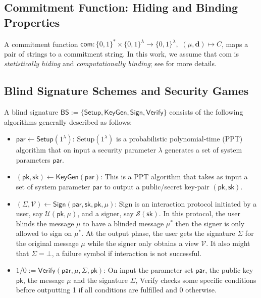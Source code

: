 \documentclass[conference]{IEEEtran}
\begin{document}
	\subsection{Commitment Function: Hiding and Binding Properties}
	A commitment function
	$\mathsf{com}: \{0,1\}^* \times \{0,1\}^{\lambda} \rightarrow \{0,1\}^{\lambda},$  $(\mu,\mathbf{d}) \mapsto C$, maps a pair of strings to a commitment string. In this work, we assume that \textsf{com} is \textit{statistically hiding} and \textit{computationally binding}; see \cite{Ruc10} for more details. %
	
	
	\subsection{Blind Signature Schemes and Security Games} \label{brs}
	A blind signature $\textsf{BS}:=\{\textsf{Setup}, \textsf{KeyGen}, \textsf{Sign}, \textsf{Verify}\}$ consists of the following algorithms generally described as follows:
	\begin{itemize}
		\item $ \mathsf{par} \leftarrow \textsf{Setup}(1^{\lambda})$: \textsf{Setup}$(1^{\lambda})$ is a probabilistic polynomial-time (PPT) algorithm that on input a security parameter $\lambda$ generates a set of system parameters $\mathsf{par}$.
		\item $(\textsf{pk},\textsf{sk}) \leftarrow \textsf{KeyGen}(\mathsf{par})$: This is a PPT algorithm that takes as input a set of system parameter $\mathsf{par}$ to output a public/secret key-pair $(\mathsf{pk},\mathsf{sk})$.
		
		\item $(\Sigma, \mathcal{V}) \leftarrow \textsf{Sign}(\mathsf{par},\mathsf{sk}, \textsf{pk},\mu)$:  \textsf{Sign} is an interaction protocol initiated by a user, say $\mathcal{U}(\textsf{pk},\mu)$, and a signer, say $\mathcal{S}(\mathsf{sk})$. In this protocol, the user blinds the message $\mu$ to have a blinded message $\mu^*$ then the signer is only allowed to sign on $\mu^*$. At the output phase, the user gets the signature $\Sigma$ for the original message $\mu$ while the signer only obtains a view $\mathcal{V}.$ It also might that $\Sigma=\bot$, a failure symbol if interaction is not successful.  
		
		\item $1/0 := \textsf{Verify}(\mathsf{par}, \mu, \Sigma, \textsf{pk})$:  On input the parameter set $\mathsf{par}$, the public key $\textsf{pk}$, the message $\mu$ and the signature $\Sigma$, \textsf{Verify} checks some specific conditions before outputting 1 if all conditions are fulfilled and 0 otherwise. 
	\end{itemize}
	
\end{document}
